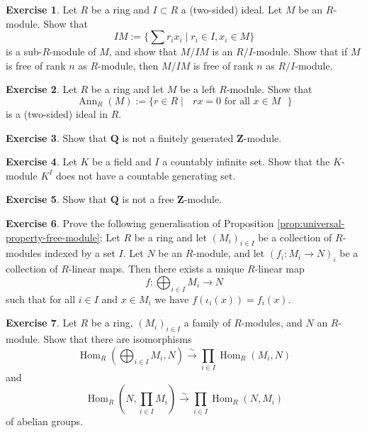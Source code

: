 \documentclass[11pt]{amsbook}
\newcommand{\longisomto}{\overset{\sim}{\longrightarrow}}
\DeclareMathOperator\Hom{Hom}
\DeclareMathOperator\Ann{Ann}
\def\bQ{{\mathbf{Q}}} \def\bZ{{\mathbf{Z}}} \def\N{{\mathbf{N}}}
\theoremstyle{plain}
\theoremstyle{definition}
\newtheorem{exercise}{Exercise}
\begin{document}
\begin{exercise}\label{exc:module-by-ideal}
Let $R$ be a ring and $I\subset R$ a (two-sided) ideal. Let $M$ be an $R$-module. Show that
\[
	IM := \{ \sum r_ix_i \mid r_i\in I, x_i\in M \}
\]
is a sub-$R$-module of $M$, and show that $M/IM$ is an $R/I$-module. Show that if $M$ is free of rank $n$ as $R$-module, then $M/IM$ is free of rank $n$ as $R/I$-module.
\end{exercise}

\begin{exercise}\label{exc:annihilator}
Let $R$ be a ring and let $M$ be a left $R$-module. Show that
\[
	\Ann_R( M ) := \{ r \in R \mid \text{ $rx=0$ for all $x\in M$ } \}
\]
is a (two-sided) ideal in $R$.
\end{exercise}


\begin{exercise}
Show that $\bQ$ is not a finitely generated $\bZ$-module.
\end{exercise}

\begin{exercise}
Let $K$ be a field and $I$ a countably infinite set. Show that the $K$-module $K^{I}$ does not have a countable generating set.
\end{exercise}


\begin{exercise}
Show that $\bQ$ is not a free $\bZ$-module.
\end{exercise}

\begin{exercise}Prove the following generalisation of Proposition \ref{prop:universal-property-free-module}: Let $R$ be a ring and let $(M_i)_{i\in I}$ be a collection of $R$-modules indexed by a set $I$. Let $N$ be an $R$-module, and let $(f_i\colon M_i \to N)_i$ be a collection of $R$-linear maps. Then there exists a unique $R$-linear map
\[
	f\colon \bigoplus_{i\in I} M_i \to N
\]
such that for all $i\in I$ and $x\in M_i$ we have $f(\iota_i(x)) = f_i(x)$.
\end{exercise}


\begin{exercise}\label{exc:universal-property-direct-sum}
Let $R$ be a ring, $(M_i)_{i\in I}$ a family of $R$-modules, and $N$ an $R$-module. Show that there are
isomorphisms
\[
	\Hom_R(\bigoplus_{i\in I} M_i, N) \longisomto \prod_{i\in I} \Hom_R(M_i,N)
\]
and
\[
	\Hom_R(N, \prod_{i\in I} M_i) \longisomto \prod_{i\in I} \Hom_R(N,M_i)
\]
of abelian groups.
\end{exercise}
\end{document}
